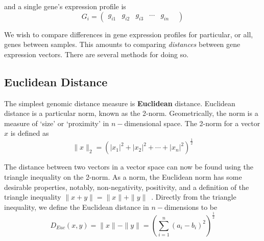 and a single gene's expression profile is
\[ G_{i} = \begin{pmatrix} g_{i1} & g_{i2} & g_{i3} & \cdots & g_{in} & \end{pmatrix} \]

We wish to compare differences in gene expression profiles for particular, or all, genes between samples.  This amounts to comparing
\textit{distances} between gene expression vectors.  There are several methods for doing so.

\subsection*{Euclidean Distance}

The simplest genomic distance measure is \textbf{Euclidean} distance.  Euclidean distance is a particular \gls{norm}, known as
the 2-norm.  Geometrically, the norm is a measure of `size' or `proximity' in $n-$dimensional space.  The 2-norm for a vector $x$ is
defined as
\[
  \|x\|_{2} = {(|x_1|^2 + |x_2|^2 + \cdots + |x_n|^2)}^{\frac{1}{2}}
\]

The distance between two vectors in a vector space can now be found using the triangle inequality on the 2-norm.  As a norm, the Euclidean
norm has some desirable properties, notably, non-negativity, positivity, and a definition of the triangle inequality
$\|x + y\| = \|x\| + \|y\|$~\cite{horn2013}.  Directly from the triangle inequality, we define the Euclidean distance in $n-$dimensions to
be
\[
  D_{Euc}(x,y) = \|x\| - \|y\| = {(\sum_{i = 1}^{n}{(a_i - b_i)}^2)}^{\frac{1}{2}}
\]



